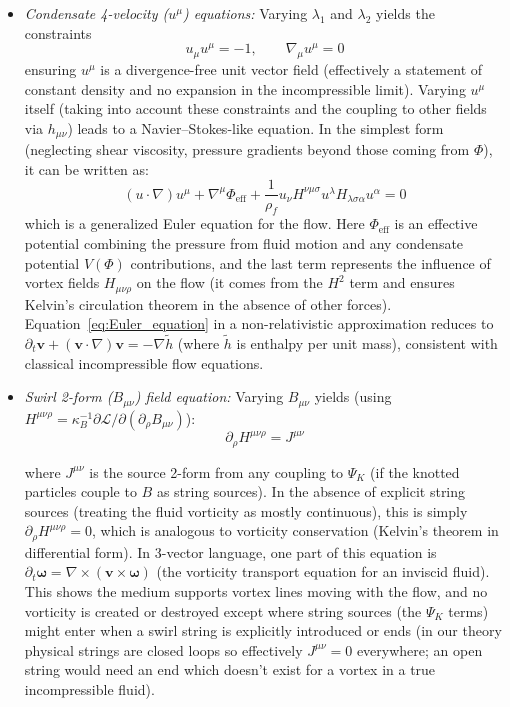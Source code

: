 \documentclass[10pt,reprint,aps,onecolumn,nofootinbib]{revtex4-2}
\newcommand{\rhoF}{\rho_{\!f}}     %
\begin{document}
\begin{itemize}

\item 
\emph{Condensate 4-velocity ($u^\mu$) equations:} Varying $\lambda_1$ and $\lambda_2$ yields the constraints
\begin{equation}
u_\mu u^\mu = -1, \qquad \nabla_\mu u^\mu = 0
\end{equation}
ensuring $u^\mu$ is a divergence-free unit vector field (effectively a statement of constant density and no expansion in the incompressible limit). Varying $u^\mu$ itself (taking into account these constraints and the coupling to other fields via $h_{\mu\nu}$) leads to a Navier–Stokes-like equation. In the simplest form (neglecting shear viscosity, pressure gradients beyond those coming from $\Phi$), it can be written as:
\begin{equation}
(u\cdot\nabla)u^\mu + \nabla^\mu \Phi_{\text{eff}} + \frac{1}{\rhoF} u_\nu H^{\nu\mu\sigma} u^\lambda H_{\lambda\sigma\alpha} u^\alpha = 0
\label{eq:Euler_equation}
\end{equation}
which is a generalized Euler equation for the flow. Here $\Phi_{\text{eff}}$ is an effective potential combining the pressure from fluid motion and any condensate potential $V(\Phi)$ contributions, and the last term represents the influence of vortex fields $H_{\mu\nu\rho}$ on the flow (it comes from the $H^2$ term and ensures Kelvin’s circulation theorem in the absence of other forces). Equation~\eqref{eq:Euler_equation} in a non-relativistic approximation reduces to $\partial_t \mathbf{v} + (\mathbf{v}\cdot\nabla)\mathbf{v} = -\nabla \tilde{h}$ (where $\tilde{h}$ is enthalpy per unit mass), consistent with classical incompressible flow equations.

\item 
\emph{Swirl 2-form ($B_{\mu\nu}$) field equation:} Varying $B_{\mu\nu}$ yields (using $H^{\mu\nu\rho} = \kappa_B^{-1} \partial \mathcal{L}/\partial (\partial_\rho B_{\mu\nu})$):
\begin{equation}
\partial_\rho H^{\mu\nu\rho} = J^{\mu\nu}
\label{eq:Beom}
\end{equation}

where $J^{\mu\nu}$ is the source 2-form from any coupling to $\Psi_K$ (if the knotted particles couple to $B$ as string sources). In the absence of explicit string sources (treating the fluid vorticity as mostly continuous), this is simply $\partial_\rho H^{\mu\nu\rho}=0$, which is analogous to vorticity conservation (Kelvin’s theorem in differential form). In 3-vector language, one part of this equation is $\partial_t \bm{\omega} = \nabla \times (\mathbf{v} \times \bm{\omega})$ (the vorticity transport equation for an inviscid fluid). This shows the medium supports vortex lines moving with the flow, and no vorticity is created or destroyed except where string sources (the $\Psi_K$ terms) might enter when a swirl string is explicitly introduced or ends (in our theory physical strings are closed loops so effectively $J^{\mu\nu}=0$ everywhere; an open string would need an end which doesn’t exist for a vortex in a true incompressible fluid).





\end{itemize}
\end{document}
